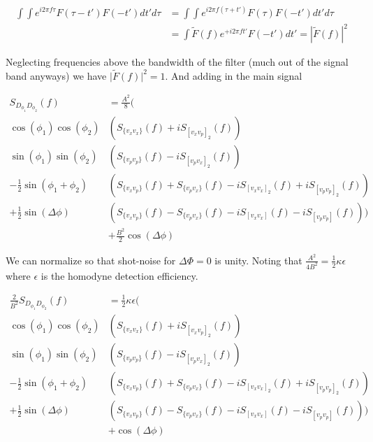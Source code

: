 \documentclass[12pt]{article}
\begin{document}
\begin{align}
\int \int e^{i 2\pi f \tau}F(\tau-t')F(-t')dt'd\tau &= \int \int e^{i 2\pi f (\tau+t')}F(\tau)F(-t')dt'd\tau\\
&=\int \tilde{F}(f) e^{+i 2\pi f t'}F(-t')dt' = |\tilde{F}(f)|^2
\end{align}

Neglecting frequencies above the bandwidth of the filter (much out of the signal band anyways) we have $\lvert\tilde{F}(f)\rvert^2 = 1$. And adding in the main signal

\begin{align}
S_{D_{\phi_1}D_{\phi_2}}(f) &= \frac{A^2}{8}\bigg(\\
\cos(\phi_1)\cos(\phi_2)&\left(S_{\{v_x v_x\}}(f) + iS_{[v_x v_p]_2}(f) \right)\\
\sin(\phi_1)\sin(\phi_2)&\left(S_{\{v_p v_p\}}(f) - iS_{[v_p v_x]_2}(f) \right)\\
-\frac{1}{2}\sin(\phi_1+\phi_2)&\left(S_{\{v_x v_p\}}(f) +S_{\{v_p v_x\}}(f) -iS_{[v_x v_x]_2}(f) +iS_{[v_p v_p]_2}(f)\right)\\
+\frac{1}{2}\sin(\Delta \phi)&\left(S_{\{v_x v_p\}}(f) -S_{\{v_p v_x\}}(f) -iS_{[v_x v_x]}(f) -iS_{[v_p v_p]}(f)\right)\bigg)\\
&+\frac{B^2}{2}\cos(\Delta \phi)
\end{align}

We can normalize so that shot-noise for $\Delta\Phi = 0$ is unity. Noting that $\frac{A^2}{4B^2} = \frac{1}{2}\kappa \epsilon$ where $\epsilon$ is the homodyne detection efficiency.

\begin{align}
\frac{2}{B^2} S_{D_{\phi_1}D_{\phi_2}}(f) &= \frac{1}{2}\kappa \epsilon \bigg(\\
\cos(\phi_1)\cos(\phi_2)&\left(S_{\{v_x v_x\}}(f) + iS_{[v_x v_p]_2}(f) \right)\\
\sin(\phi_1)\sin(\phi_2)&\left(S_{\{v_p v_p\}}(f) - iS_{[v_p v_x]_2}(f) \right)\\
-\frac{1}{2}\sin(\phi_1+\phi_2)&\left(S_{\{v_x v_p\}}(f) +S_{\{v_p v_x\}}(f) -iS_{[v_x v_x]_2}(f) +iS_{[v_p v_p]_2}(f)\right)\\
+\frac{1}{2}\sin(\Delta \phi)&\left(S_{\{v_x v_p\}}(f) -S_{\{v_p v_x\}}(f) -iS_{[v_x v_x]}(f) -iS_{[v_p v_p]}(f)\right)\bigg)\\
&+\cos(\Delta \phi)
\end{align}
\end{document}
